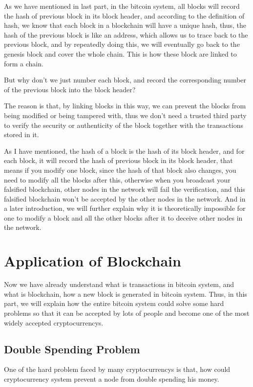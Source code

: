 \documentclass[12pt,a4paper]{article}
\begin{document}
As we have mentioned in last part, in the bitcoin system, all blocks will record the hash of previous block in its block header, and according to the definition of hash, we know that each block in a blockchain will have a unique hash, thus, the hash of the previous block is like an address, which allows us to trace back to the previous block, and by repeatedly doing this, we will eventually go back to the genesis block and cover the whole chain. This is how these block are linked to form a chain.

But why don't we just number each block, and record the corresponding number of the previous block into the block header?

The reason is that, by linking blocks in this way, we can prevent the blocks from being modified or being tampered with, thus we don't need a trusted third party to verify the security or authenticity of the block together with the transactions stored in it.

As I have mentioned, the hash of a block is the hash of its block header, and for each block, it will record the hash of previous block in its block header, that means if you modify one block, since the hash of that block also changes, you need to modify all the blocks after this, otherwise when you broadcast your falsified blockchain, other nodes in the network will fail the verification, and this falsified blockchain won't be accepted by the other nodes in the network. And in a later introduction, we will further explain why it is theoretically impossible for one to modify a block and all the other blocks after it to deceive other nodes in the network.



\section{Application of Blockchain}

Now we have already understand what is transactions in bitcoin system, and what is blockchain, how a new block is generated in bitcoin system. Thus, in this part, we will explain how the entire bitcoin system could solve some hard problems so that it can be accepted by lots of people and become one of the most widely accepted cryptocurrencys.

\subsection{Double Spending Problem}
One of the hard problem faced by many cryptocurrencys is that, how could cryptocurrency system
 prevent a node from double spending his money.
 
\end{document}
